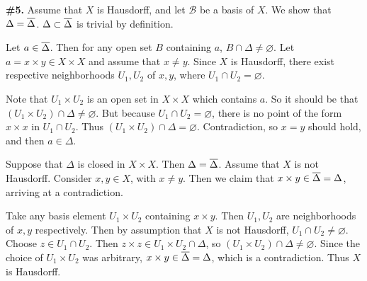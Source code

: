 \documentclass[a4paper,11pt]{article}
\newcommand{\B}{\mathcal{B}}
\begin{document}
\begin{minipage}[t][270mm]{90mm}
    {\bfseries \large \#5.} Assume that \(X\) is Hausdorff, and let \(\B\) be a basis of \(X\). We show that \(\Delta = \overline{\Delta}\). \(\Delta \subset \overline{\Delta}\) is trivial by definition.

    \bigskip

    Let \(a \in \overline{\Delta}\). Then for any open set \(B\) containing \(a\), \(B \cap \Delta \neq \varnothing\). Let \(a = x \times y \in X\times X\) and assume that \(x \neq y\). Since \(X\) is Hausdorff, there exist respective neighborhoods \(U_1, U_2\) of \(x, y\), where \(U_1 \cap U_2 = \varnothing\).

    Note that \(U_1 \times U_2\) is an open set in \(X \times X\) which contains \(a\). So it should be that \((U_1\times U_2) \cap \Delta \neq \varnothing\). But because \(U_1 \cap U_2 = \varnothing\), there is no point of the form \(x \times x\) in \(U_1 \cap U_2\). Thus \((U_1 \times U_2) \cap \Delta = \varnothing\). Contradiction, so \(x = y\) should hold, and then \(a \in \Delta\).

    \bigskip

    Suppose that \(\Delta\) is closed in \(X \times X\). Then \(\Delta = \overline{\Delta}\). Assume that \(X\) is not Hausdorff. Consider \(x, y \in X\), with \(x \neq y\). Then we claim that \(x \times y \in \overline{\Delta} = \Delta\), arriving at a contradiction.

    Take any basis element \(U_1 \times U_2\) containing \(x \times y\). Then \(U_1, U_2\) are neighborhoods of \(x, y\) respectively. Then by assumption that \(X\) is not Hausdorff, \(U_1 \cap U_2 \neq \varnothing\). Choose \(z \in U_1 \cap U_2\). Then \(z\times z \in U_1 \times U_2 \cap \Delta\), so \((U_1 \times U_2) \cap \Delta \neq \varnothing\). Since the choice of \(U_1 \times U_2\) was arbitrary, \(x\times y \in \overline{\Delta} = \Delta\), which is a contradiction. Thus \(X\) is Hausdorff.
\end{minipage}
{\color{gray}\vline}
\begin{minipage}[t][270mm]{90mm}
    \phantom{?}
\end{minipage}

\newpage

\phantom{?}
\vspace{5mm}
\end{document}
